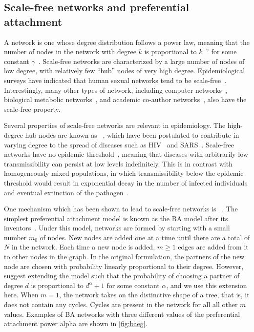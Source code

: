 \subsection{Scale-free networks and preferential attachment}
\label{subsec:pa}

A  network is one whose degree distribution follows a power
law, meaning that the number of nodes in the network with degree $k$ is
proportional to $k^{-\gamma}$ for some constant
$\gamma$~\autocite{barabasi1999emergence}. Scale-free networks are
characterized by a large number of nodes of low degree, with relatively few
``hub'' nodes of very high degree. Epidemiological surveys have indicated that
human sexual networks tend to be scale-free~\autocite{liljeros2001web,
schneeberger2004scale, colgate1989risk, clemenccon2015statistical}.
Interestingly, many other types of network, including computer
networks~\autocite{pastor2001epidemic}, biological metabolic
networks~\autocite{jeong2000large}, and academic co-author
networks~\autocite{barabasi2002evolution}, also have the scale-free property.

Several properties of scale-free networks are relevant in epidemiology.  The
high-degree hub nodes are known as
~\autocite{kemper1980identification}, which have been
postulated to contribute in varying degree to the spread of diseases such as
\gls{HIV}~\autocite{stadler2013uncovering} and
\gls{SARS}~\autocite{shen2004superspreading}. Scale-free networks have no
epidemic threshold~\autocite{pastor2001epidemic}, meaning that diseases with
arbitrarily low transmissibility can persist at low levels indefinitely. This
is in contrast with homogeneously mixed populations, in which transmissibility
below the epidemic threshold would result in exponential decay in the number of
infected individuals and eventual extinction of the
pathogen~\autocite{anderson1992infectious}.

One mechanism which has been shown to lead to scale-free networks is
~\autocite{simon1955class,
barabasi1999emergence}. The simplest preferential attachment model is known as
the \gls{BA} model after its inventors~\autocite{barabasi1999emergence}. Under
this model, networks are formed by starting with a small number $m_0$ of nodes.
New nodes are added one at a time until there are a total of $N$ in the
network. Each time a new node is added, $m \geq 1$ edges are added from it to
other nodes in the graph. In the original formulation, the partners of the new
node are chosen with probability linearly proportional to their degree.
However, \citeauthor{barabasi1999emergence} suggest extending the model such
that the probability of choosing a partner of degree $d$ is proportional to
$d^\alpha + 1$ for some constant $\alpha$, and we use this extension here. When
$m = 1$, the network takes on the distinctive shape of a tree, that is, it does
not contain any cycles. Cycles are present in the network for all all other $m$
values. Examples of \gls{BA} networks with three different values of the
preferential attachment power \gls{alpha} are shown in \cref{fig:baeg}.

